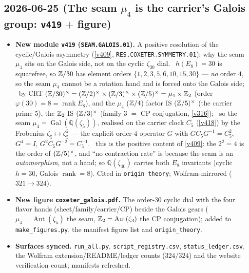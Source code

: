 \subsection*{2026-06-25 (The seam $\mu_4$ is the carrier's Galois group: \texttt{v419} $+$ figure)}
\begin{itemize}
\item \textbf{New module \texttt{v419} (\texttt{SEAM.GALOIS.01}).} A positive resolution of the
cyclic/Galois asymmetry (\vref{v409}, \texttt{RES.COXETER.SYMMETRY.01}): why the seam $\mu_4$ sits on the
Galois side, not on the cyclic $\zeta_{30}$ dial. \mE\ $h(E_8)=30$ is squarefree, so $\mathbb{Z}/30$ has element
orders $\{1,2,3,5,6,10,15,30\}$ --- \emph{no} order $4$, so the seam $\mu_4$ cannot be a rotation hand and
is forced onto the Galois side; \mE\ by CRT $(\mathbb{Z}/30)^\times=(\mathbb{Z}/2)^\times\times(\mathbb{Z}/3)^\times\times(\mathbb{Z}/5)^\times
=\mu_4\times\mathbb{Z}_2$ (order $\varphi(30)=8=\operatorname{rank}E_8$), and the $\mu_4$ ($\mathbb{Z}/4$) factor IS
$(\mathbb{Z}/5)^\times$ (the
carrier prime $5$), the $\mathbb{Z}_2$ IS $(\mathbb{Z}/3)^\times$ (family $3$ $=$ CP conjugation, \vref{v316}); \mE\ so the
seam $\mu_4=\operatorname{Gal}(\mathbb Q(\zeta_5))$, realised on the carrier clock $C_5$ (\vref{v418}) by the
Frobenius $\zeta_5\mapsto\zeta_5^2$ --- the explicit order-$4$ operator $G$ with $GC_5G^{-1}=C_5^2$, $G^4=I$,
$G^2C_5G^{-2}=C_5^{-1}$. \mC\ this is the positive content of \vref{v409}: the $2^2{=}4$ is the order of
$(\mathbb{Z}/5)^\times$, and ``no contraction rate'' is because the seam is an \emph{automorphism}, not a hand; so
$\mathbb Q(\zeta_{30})$ carries both $E_8$ invariants (cyclic $h{=}30$, Galois $\operatorname{rank}{=}8$).
Cited in \texttt{origin\_theory}; Wolfram-mirrored ($321\to324$).
\item \textbf{New figure \texttt{coxeter\_galois.pdf}.} The order-$30$ cyclic dial with the four flavor
hands (sheet/family/carrier/CP) beside the Galois gears ($\mu_4=\operatorname{Aut}(\zeta_5)$ the seam,
$\mathbb{Z}_2=\operatorname{Aut}(\zeta_3)$ the CP conjugation); added to \texttt{make\_figures.py}, the manifest
figure list and \texttt{origin\_theory}.
\item \textbf{Surfaces synced.} \texttt{run\_all.py}, \texttt{script\_registry.csv},
\texttt{status\_ledger.csv}, the Wolfram extension/README/ledger counts ($324/324$) and the website
verification count; manifests refreshed.
\end{itemize}

